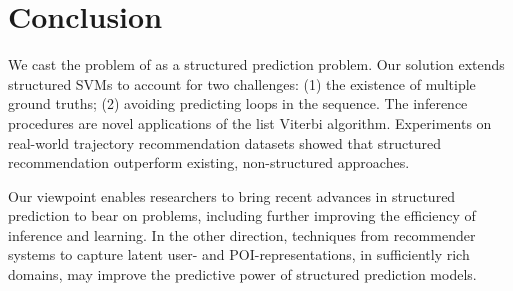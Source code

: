 
\section{Conclusion}

We cast the problem of {\trajrec}
as a structured prediction problem.
Our solution extends structured SVMs to account for two challenges:
(1) the existence of multiple ground truths;
(2) avoiding predicting loops in the sequence.
The inference procedures are novel applications of the list Viterbi algorithm.
Experiments on real-world trajectory recommendation datasets showed that
structured recommendation outperform existing, non-structured approaches.

Our viewpoint enables researchers to bring recent advances in structured prediction
to bear on {\trajrec} problems,
including further improving the efficiency of inference and learning.
In the other direction, techniques from recommender systems to capture latent
user- and POI-representations, in sufficiently rich domains, may
improve the predictive power of structured prediction models.
